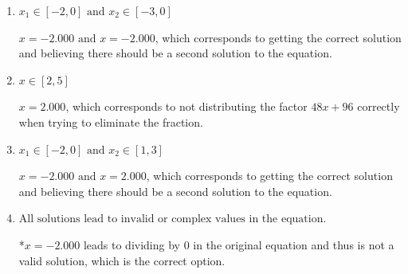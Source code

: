 \documentclass{extbook}[14pt]
\begin{document}
\begin{enumerate}
{\begin{enumerate}[label=\Alph*.]
$x = -2.000$, which corresponds to not checking if this value leads to dividing by 0 in the original equation and thus is not a valid solution.
\item \( x_1 \in [-2, 0] \text{ and } x_2 \in [-3,0] \)

$x = -2.000 \text{ and } x = -2.000$, which corresponds to getting the correct solution and believing there should be a second solution to the equation.
\item \( x \in [2,5] \)

$x = 2.000$, which corresponds to not distributing the factor $48x + 96$ correctly when trying to eliminate the fraction.
\item \( x_1 \in [-2, 0] \text{ and } x_2 \in [1,3] \)

$x = -2.000 \text{ and } x = 2.000$, which corresponds to getting the correct solution and believing there should be a second solution to the equation.
\item \( \text{All solutions lead to invalid or complex values in the equation.} \)

*$x = -2.000$ leads to dividing by 0 in the original equation and thus is not a valid solution, which is the correct option.
\end{enumerate}

}
\end{enumerate}
\end{document}
